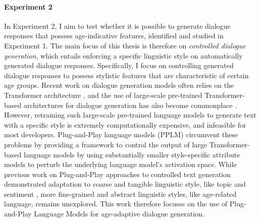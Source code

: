 \paragraph{Experiment 2} In Experiment 2, I aim to test whether it is possible to generate dialogue responses that possess age-indicative features, identified and studied in Experiment 1.
The main focus of this thesis is therefore on \textit{controlled dialogue generation}, which entails enforcing a specific linguistic style on automatically generated dialogue responses.
Specifically, I focus on controlling generated dialogue responses to possess stylistic features that are characteristic of certain age groups.
Recent work on dialogue generation models often relies on the Transformer architecture \citep{vaswani2017attention}, and the use of large-scale pre-trained Transformer-based architectures for dialogue generation has also become commonplace \citep{zhang2019dialogpt, brown2020language-models-few-shot-gpt3}.
However, retraining such large-scale pre-trained language models to generate text with a specific style is extremely computationally expensive, and infeasible for most developers.
Plug-and-Play language models (PPLM) \citep{dathathri2019plug} circumvent these problems by providing a framework to control the output of large Transformer-based language models by using substantially smaller style-specific attribute models to perturb the underlying language model's activation space.
While previous work on Plug-and-Play approaches to controlled text generation demonstrated adaptation to coarse and tangible linguistic style, like topic and sentiment \citep{madotto-etal-2020-plug}, more fine-grained and abstract linguistic styles, like age-related language, remains unexplored.
This work therefore focuses on the use of Plug-and-Play Language Models for age-adaptive dialogue generation.

